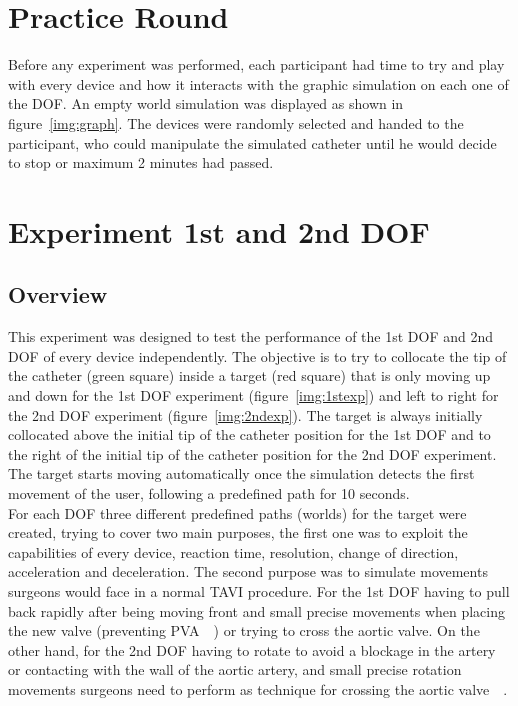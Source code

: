 \section{Practice Round}\label{sec:pratround}
Before any experiment was performed, each participant had time to try and play with every device and how it interacts with the graphic simulation on each one of the DOF. An empty world simulation was displayed as shown in figure~\ref{img:graph}. The devices were randomly selected and handed to the participant, who could manipulate the simulated catheter until he would decide to stop or maximum 2 minutes had passed.\\


\section{Experiment 1st and 2nd DOF}\label{sec:1stexp}
\subsection{Overview}\label{subsec:1stover}
This experiment was designed to test the performance of the 1st DOF and 2nd DOF of every device independently. The objective is to try to collocate the tip of the catheter (green square) inside a target (red square) that is only moving up and down for the 1st DOF experiment (figure~\ref{img:1stexp}) and left to right for the 2nd DOF experiment (figure~\ref{img:2ndexp}). The target is always initially collocated above the initial tip of the catheter position for the 1st DOF and to the right of the initial tip of the catheter position for the 2nd DOF experiment. The target starts moving automatically once the simulation detects the first movement of the user, following a predefined path for 10 seconds.\\

For each DOF three different predefined paths (worlds) for the target were created, trying to cover two main purposes, the first one was to exploit the capabilities of every device, reaction time, resolution, change of direction, acceleration and deceleration. The second purpose was to simulate movements surgeons would face in a normal TAVI procedure. For the 1st DOF having to pull back rapidly after being moving front and small precise movements when placing the new valve (preventing PVA~\cite{pvl}~\cite{pvl2}) or trying to cross the aortic valve. On the other hand, for the 2nd DOF having to rotate to avoid a blockage in the artery or contacting with the wall of the aortic artery, and small precise rotation movements surgeons need to perform as technique for crossing the aortic valve~\cite{raptech}~\cite{anatomic}.\\

